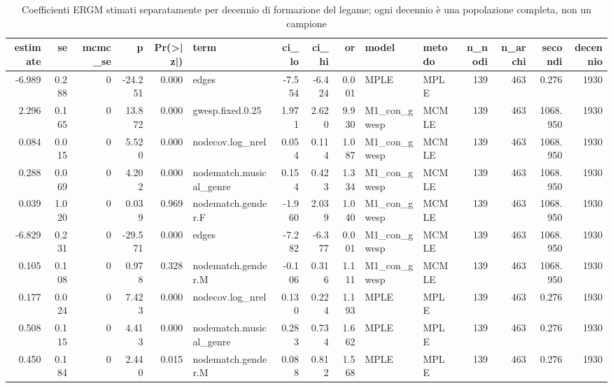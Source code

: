 \begin{table}
\centering
\caption{Coefficienti ERGM stimati separatamente per decennio di formazione del legame; ogni decennio è una popolazione completa, non un campione}
\label{tab:t4_ergm_decenni}
\begin{tabular}{rrrrrlrrrllrrrr}
\toprule
 estimate &    se &  mcmc\_se &        p &  Pr(>|z|) &                    term &   ci\_lo &   ci\_hi &     or &        model & metodo &  n\_nodi &  n\_archi &   secondi &  decennio \\
\midrule
   -6.989 & 0.288 &        0 &  -24.251 &     0.000 &                   edges &  -7.554 &  -6.424 &  0.001 &         MPLE &   MPLE &     139 &      463 &     0.276 &      1930 \\
    2.296 & 0.165 &        0 &   13.872 &     0.000 &        gwesp.fixed.0.25 &   1.971 &   2.620 &  9.930 & M1\_con\_gwesp &  MCMLE &     139 &      463 &  1068.950 &      1930 \\
    0.084 & 0.015 &        0 &    5.520 &     0.000 &        nodecov.log\_nrel &   0.054 &   0.114 &  1.087 & M1\_con\_gwesp &  MCMLE &     139 &      463 &  1068.950 &      1930 \\
    0.288 & 0.069 &        0 &    4.202 &     0.000 & nodematch.musical\_genre &   0.154 &   0.423 &  1.334 & M1\_con\_gwesp &  MCMLE &     139 &      463 &  1068.950 &      1930 \\
    0.039 & 1.020 &        0 &    0.039 &     0.969 &      nodematch.gender.F &  -1.960 &   2.039 &  1.040 & M1\_con\_gwesp &  MCMLE &     139 &      463 &  1068.950 &      1930 \\
   -6.829 & 0.231 &        0 &  -29.571 &     0.000 &                   edges &  -7.282 &  -6.377 &  0.001 & M1\_con\_gwesp &  MCMLE &     139 &      463 &  1068.950 &      1930 \\
    0.105 & 0.108 &        0 &    0.978 &     0.328 &      nodematch.gender.M &  -0.106 &   0.316 &  1.111 & M1\_con\_gwesp &  MCMLE &     139 &      463 &  1068.950 &      1930 \\
    0.177 & 0.024 &        0 &    7.423 &     0.000 &        nodecov.log\_nrel &   0.130 &   0.224 &  1.193 &         MPLE &   MPLE &     139 &      463 &     0.276 &      1930 \\
    0.508 & 0.115 &        0 &    4.413 &     0.000 & nodematch.musical\_genre &   0.283 &   0.734 &  1.662 &         MPLE &   MPLE &     139 &      463 &     0.276 &      1930 \\
    0.450 & 0.184 &        0 &    2.440 &     0.015 &      nodematch.gender.M &   0.088 &   0.812 &  1.568 &         MPLE &   MPLE &     139 &      463 &     0.276 &      1930 \\

\end{tabular}
\end{table}
